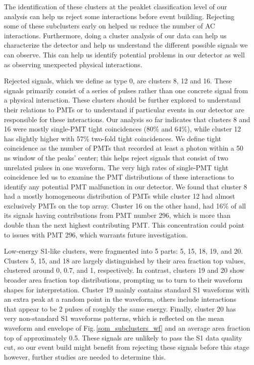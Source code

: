 The identification of these clusters at the peaklet classification level of our analysis can help us reject some interactions before event building. Rejecting some of these subclusters early on helped us reduce the number of AC interactions. Furthermore, doing a cluster analysis of our data can help us characterize the detector and help us understand the different possible signals we can observe. This can help us identify potential problems in our detector as well as observing unexpected physical interactions.

Rejected signals, which we define as type 0, are clusters 8, 12 and 16. These signals primarily consist of a series of pulses rather than one concrete signal from a physical interaction. These clusters should be further explored to understand their relations to PMTs or to understand if particular events in our detector are responsible for these interactions. Our analysis so far indicates that clusters 8 and 16 were mostly single-PMT tight coincidences (80\% and 64\%), while cluster 12 has slightly higher with 57\% two-fold tight coincidences. We define tight coincidence as the number of PMTs that recorded at least a photon within a 50 ns window of the peaks' center; this helps reject signals that consist of two unrelated pulses in one waveform. The very high rates of single-PMT tight coincidence led us to examine the PMT distributions of these interactions to identify any potential PMT malfunction in our detector. We found that cluster 8 had a mostly homogeneous distribution of PMTs while cluster 12 had almost exclusively PMTs on the top array. Cluster 16 on the other hand, had 16\% of all its signals having contributions from PMT number 296, which is more than double than the next highest contributing PMT. This concentration could point to issues with PMT 296, which warrants future investigation.

Low-energy S1-like clusters, were fragmented into 5 parts: 5, 15, 18, 19, and 20. Clusters 5, 15, and 18 are largely distinguished by their area fraction top values, clustered around 0, 0.7, and 1, respectively. In contrast, clusters 19 and 20 show broader area fraction top distributions, prompting us to turn to their waveform shapes for interpretation. Cluster 19 mainly contains standard S1 waveforms with an extra peak at a random point in the waveform, others include interactions that appear to be 2 pulses of roughly the same energy. Finally, cluster 20 has very non-standard S1 waveforms patterns, which is reflected on the mean waveform and envelope of Fig.\,\ref{som_subclusters_wf} and an average area fraction top of approximately 0.5. These signals are unlikely to pass the S1 data quality cut, so our event build might benefit from rejecting these signals before this stage however, further studies are needed to determine this.

